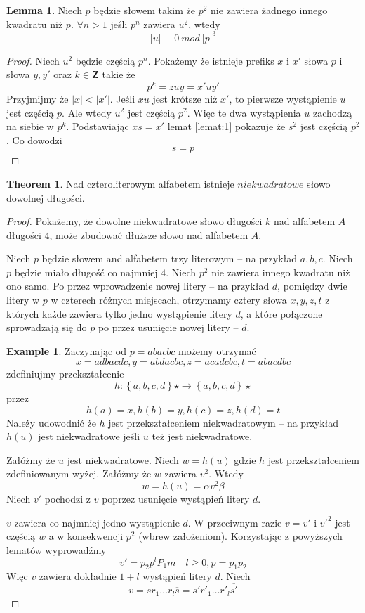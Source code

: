 \documentclass[11pt,a4paper]{article}
\theoremstyle{definition}
\newtheorem{theorem}{Theorem}[section]
\newtheorem{lemma}{Lemma}[section]
\newtheorem{example}{Example}[section]
\begin{document}
\begin{lemma}\label{lemat:2}
Niech $p$ będzie słowem takim że $p^2$ nie zawiera żadnego innego kwadratu niż $p$.
$\forall n > 1$ jeśli 
$p^n$ zawiera $u^2$, wtedy $$|u| \equiv 0 ~mod~ |p|^3$$
\begin{proof}
Niech $u^2$ będzie częścią $p^n$. Pokażemy że istnieje prefiks $x$ i $x'$
słowa $p$ i słowa $y,y'$ oraz $k \in \mathbf{Z}$ takie że
$$p^k = zuy = x'uy'$$
Przyjmijmy że $|x| < |x'|$. Jeśli $xu$ jest krótsze niż $x'$, to pierwsze wystąpienie
$u$ jest częścią $p$. Ale wtedy $u^2$ jest częścią $p^2$. Więc te dwa wystąpienia $u$
zachodzą na siebie w $p^k$.
Podstawiając $xs = x'$ lemat \ref{lemat:1} pokazuje że $s^2$ jest częścią $p^2$.
Co dowodzi
$$ s = p $$
\end{proof}
\end{lemma}

\begin{theorem}
Nad czteroliterowym alfabetem istnieje $niekwadratowe$
słowo dowolnej długości.
\begin{proof}
Pokażemy, że dowolne niekwadratowe słowo długości $k$ nad alfabetem $A$
długości $4$, może zbudować dłuższe słowo nad alfabetem $A$.

Niech $p$ będzie słowem and alfabetem trzy literowym -- na przykład $a,b,c$.
Niech $p$ będzie miało długość co najmniej $4$.
Niech $p^2$ nie zawiera innego kwadratu niż ono samo.
Po przez wprowadzenie nowej litery -- na przykład $d$, pomiędzy
dwie litery w $p$ w czterech różnych miejscach, otrzymamy cztery
słowa $x,y,z,t$ z których każde zawiera tylko jedno wystąpienie litery $d$,
a które połączone sprowadzają się do $p$ po przez usunięcie nowej litery -- $d$.

\begin{example}
Zaczynając od $p = abacbc$ możemy otrzymać
$$
x = adbacdc, y = abdacbc, z = acadcbc, t = abacdbc
$$
zdefiniujmy przekształcenie 
$$
h: \left\lbrace a,b,c,d\right\rbrace\star \rightarrow \left\lbrace a,b,c,d\right\rbrace\star 
$$
przez
$$
h(a) = x, h(b) = y, h(c) = z, h(d) = t
$$
Należy udowodnić że $h$ jest przekształceniem niekwadratowym -- na przykład
$h(u)$ jest niekwadratowe jeśli $u$ też jest niekwadratowe.
\end{example}
Załóżmy że $u$ jest niekwadratowe. Niech $w=h(u)$ gdzie $h$ jest przekształceniem
zdefiniowanym wyżej. Załóżmy że $w$ zawiera $v^2$. Wtedy
$$
w = h(u) = \alpha v^2\beta
$$
Niech $v'$ pochodzi z $v$ poprzez usunięcie wystąpień litery $d$.

$v$ zawiera co najmniej jedno wystąpienie $d$. W przeciwnym razie $v = v'$ i
$v'^2$ jest częścią $w$ a w konsekwencji $p^2$ (wbrew założeniom). Korzystając z 
powyższych lematów wyprowadźmy
$$
v' = p_2 p^l P_1 m \quad l \geq 0, p = p_1 p_2
$$
Więc $v$ zawiera dokładnie $1+l$ wystąpień litery $d$. Niech
$$
v = sr_1\dots r_l\overline{s} = s'r'_1\dots r'_l\overline{s'}
$$
\end{proof}
\end{theorem}
\end{document}
